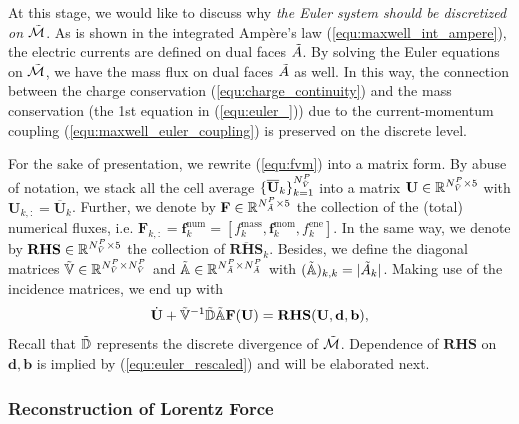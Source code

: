 \documentclass{article}
\begin{document}
At this stage, we would like to discuss why \emph{the Euler system should be discretized
  on $\Tilde{\mathcal{M}}$}. As is shown in the integrated Amp\`{e}re's law
(\ref{equ:maxwell_int_ampere}), the electric currents are defined on dual faces
$\Tilde{A}$. By solving the Euler equations on $\Tilde{\mathcal{M}}$, we have the mass
flux on dual faces $\Tilde{A}$ as well. In this way, the connection between the charge
conservation (\ref{equ:charge_continuity}) and the mass conservation (the 1st equation in
(\ref{equ:euler_})) due to the current-momentum coupling
(\ref{equ:maxwell_euler_coupling}) is preserved on the discrete level.

For the sake of presentation, we rewrite (\ref{equ:fvm}) into a matrix form. By abuse of
notation, we stack all the cell average
$\{\overline{\mathbf{U}}_k\}_{k=1}^{N^P_{\Tilde{V}}}$ into a matrix
$\mathbf{U} \in \mathbb{R}^{N_{\Tilde{V}}^P \times 5}$ with
$\mathbf{U}_{k,:} = \overline{\mathbf{U}}_k$. Further, we denote by
$\mathbf{F} \in \mathbb{R}^{N_{\Tilde{A}}^P \times 5}$ the collection of the (total)
numerical fluxes, i.e.
$\mathbf{F}_{k,:} = \mathbf{f}^\text{num}_k = [f^\text{mass}_k, \bm{f}^\text{mom}_k,
f^\text{ene}_k]$. In the same way, we denote by
$\mathbf{RHS}\in \mathbb{R}^{N_{\Tilde{V}}^P \times 5}$ the collection of
$\overline{\mathbf{RHS}}_k$. Besides, we define the diagonal matrices
$\mathbb{\Tilde{V}} \in \mathbb{R}^{N_{\Tilde{V}}^P \times N_{\Tilde{V}}^P}$ and
$\mathbb{\Tilde{A}}\in \mathbb{R}^{N_{\Tilde{A}}^P \times N_{\Tilde{A}}^P}$ with
$(\mathbb{\Tilde{A}})_{k,k} = |\Tilde{A}_k|$. Making use of the incidence matrices, we end
up with
\begin{equation} \label{equ:euler_matrix_form}
    \dot{\mathbf{U}} + \mathbb{\Tilde{V}}^{-1}\mathbb{\Tilde{D}}\mathbb{\Tilde{A}}\mathbf{F}(\mathbf{U})  = \mathbf{RHS}(\mathbf{U},\mathbf{d},\mathbf{b}),
\end{equation}
Recall that $\Tilde{\mathbb{D}}$ represents the discrete divergence of
$\Tilde{\mathcal{M}}$. Dependence of $\mathbf{RHS}$ on $\mathbf{d}, \mathbf{b}$ is implied
by (\ref{equ:euler_rescaled}) and will be elaborated next.

\subsubsection{Reconstruction of Lorentz Force}
\end{document}
